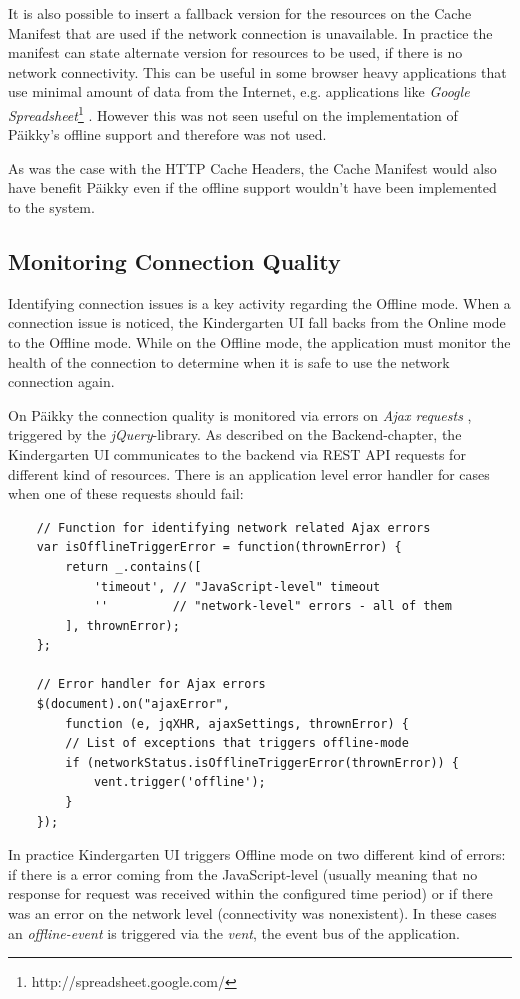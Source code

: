 It is also possible to insert a fallback version for the resources on the Cache Manifest that are used if the network connection is unavailable. In practice the manifest can state alternate version for resources to be used, if there is no network connectivity. This can be useful in some browser heavy applications that use minimal amount of data from the Internet, e.g. applications like \textit{Google Spreadsheet}\footnote{http://spreadsheet.google.com/} \cite{_using_????}. However this was not seen useful on the implementation of Päikky's offline support and therefore was not used. 

As was the case with the HTTP Cache Headers, the Cache Manifest would also have benefit Päikky even if the offline support wouldn't have been implemented to the system.







\subsection{Monitoring Connection Quality}
\label{subsec:connection-monitoring}
Identifying connection issues is a key activity regarding the Offline mode. When a connection issue is noticed, the Kindergarten UI fall backs from the Online mode to the Offline mode. While on the Offline mode, the application must monitor the health of the connection to determine when it is safe to use the network connection again.

On Päikky the connection quality is monitored via errors on \textit{Ajax requests} \cite{_.ajaxerror_????}, triggered by the \textit{jQuery}-library. As described on the Backend-chapter, the Kindergarten UI communicates to the backend via REST API requests for different kind of resources. There is an application level error handler for cases when one of these requests should fail:
\begin{lstlisting}
    // Function for identifying network related Ajax errors
    var isOfflineTriggerError = function(thrownError) {
        return _.contains([
            'timeout', // "JavaScript-level" timeout
            ''         // "network-level" errors - all of them
        ], thrownError);
    };

    // Error handler for Ajax errors
    $(document).on("ajaxError",
        function (e, jqXHR, ajaxSettings, thrownError) {
        // List of exceptions that triggers offline-mode
        if (networkStatus.isOfflineTriggerError(thrownError)) {
            vent.trigger('offline');
        }
    });
\end{lstlisting}
\noindent
In practice Kindergarten UI triggers Offline mode on two different kind of errors: if there is a error coming from the JavaScript-level (usually meaning that no response for request was received within the configured time period) or if there was an error on the network level (connectivity was nonexistent). In these cases an \textit{offline-event} is triggered via the \textit{vent}, the event bus of the application.

